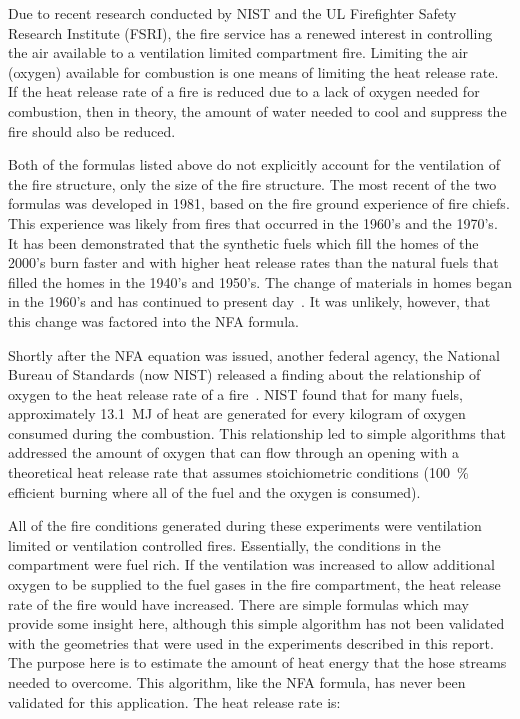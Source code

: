 \documentclass[12pt,oneside]{book}
\begin{document}
Due to recent research conducted by NIST and the UL Firefighter Safety Research Institute (FSRI), the fire service has a renewed interest in controlling the air available to a ventilation limited compartment fire. Limiting the air (oxygen) available for combustion is one means of limiting the heat release rate. If the heat release rate of a fire is reduced due to a lack of oxygen needed for combustion, then in theory, the amount of water needed to cool and suppress the fire should also be reduced.    

Both of the formulas listed above do not explicitly account for the ventilation of the fire structure, only the size of the fire structure. The most recent of the two formulas was developed in 1981, based on the fire ground experience of fire chiefs. This experience was likely from fires that occurred in the 1960's and the 1970's. It has been demonstrated that the synthetic fuels which fill the homes of the 2000's burn faster and with higher heat release rates than the natural fuels that filled the homes in the 1940's and 1950's. The change of materials in homes began in the 1960's and has continued to present day~\cite{Kerber:2}. It was unlikely, however, that this change was factored into the NFA formula.   

Shortly after the NFA equation was issued, another federal agency, the National Bureau of Standards (now NIST) released a finding about the relationship of oxygen to the heat release rate of a fire~\cite{Babrauskas:3}. NIST found that for many fuels, approximately 13.1~MJ of heat are generated for every kilogram of oxygen consumed during the combustion. This relationship led to simple algorithms that addressed the amount of oxygen that can flow through an opening with a theoretical heat release rate that assumes stoichiometric conditions (100~\% efficient burning where all of the fuel and the oxygen is consumed).

All of the fire conditions generated during these experiments were ventilation limited or ventilation controlled fires. Essentially, the conditions in the compartment were fuel rich. If the ventilation was increased to allow additional oxygen to be supplied to the fuel gases in the fire compartment, the heat release rate of the fire would have increased. There are simple formulas which may provide some insight here, although this simple algorithm has not been validated with the geometries that were used in the experiments described in this report. The purpose here is to estimate the amount of heat energy that the hose streams needed to overcome. This algorithm, like the NFA formula, has never been validated for this application. The heat release rate is: 
\end{document}
